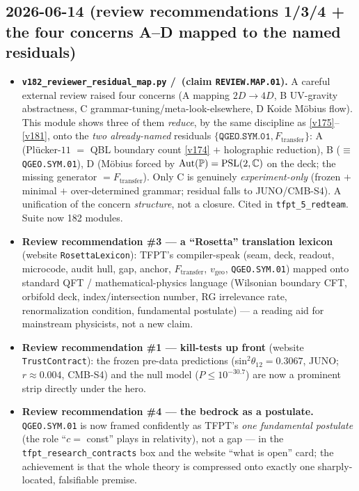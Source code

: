 \subsection*{2026-06-14 (review recommendations 1/3/4 + the four concerns A--D mapped to the named residuals)}
\begin{itemize}
\item \textbf{\texttt{v182\_reviewer\_residual\_map.py} \mE/\mC\ (claim \texttt{REVIEW.MAP.01}).} A
  careful external review raised four concerns (A mapping $2D\!\to\!4D$, B UV-gravity abstractness,
  C grammar-tuning/meta-look-elsewhere, D Koide M\"obius flow). This module shows three of them
  \emph{reduce}, by the same discipline as \vref{v175}--\vref{v181}, onto the \emph{two already-named}
  residuals $\{\texttt{QGEO.SYM.01},F_{\mathrm{transfer}}\}$: A (Pl\"ucker-$11$ $=$ QBL boundary count
  \vref{v174} $+$ holographic reduction), B ($\equiv$ \texttt{QGEO.SYM.01}), D (M\"obius forced by
  $\mathrm{Aut}(\mathbb{P})=\mathrm{PSL}(2,\mathbb C)$ on the deck; the missing generator $=F_{\mathrm{transfer}}$).
  Only C is genuinely \emph{experiment-only} (frozen $+$ minimal $+$ over-determined grammar; residual
  falls to JUNO/CMB-S4). A unification of the concern \emph{structure}, not a closure. Cited in
  \texttt{tfpt\_5\_redteam}. Suite now 182 modules.
\item \textbf{Review recommendation \#3 --- a ``Rosetta'' translation lexicon} (website
  \texttt{RosettaLexicon}): TFPT's compiler-speak (seam, deck, readout, microcode, audit hull, gap,
  anchor, $F_{\mathrm{transfer}}$, $v_{\mathrm{geo}}$, \texttt{QGEO.SYM.01}) mapped onto standard QFT /
  mathematical-physics language (Wilsonian boundary CFT, orbifold deck, index/intersection number, RG
  irrelevance rate, renormalization condition, fundamental postulate) --- a reading aid for
  mainstream physicists, not a new claim.
\item \textbf{Review recommendation \#1 --- kill-tests up front} (website \texttt{TrustContract}): the
  frozen pre-data predictions (sin$^2\theta_{12}=0.3067$, JUNO; $r\approx0.004$, CMB-S4) and the null
  model ($P\le10^{-30.7}$) are now a prominent strip directly under the hero.
\item \textbf{Review recommendation \#4 --- the bedrock as a postulate.} \texttt{QGEO.SYM.01} is now
  framed confidently as TFPT's \emph{one fundamental postulate} (the role ``$c=$ const'' plays in
  relativity), not a gap --- in the \texttt{tfpt\_research\_contracts} box and the website ``what is
  open'' card; the achievement is that the whole theory is compressed onto exactly one sharply-located,
  falsifiable premise.
\end{itemize}

